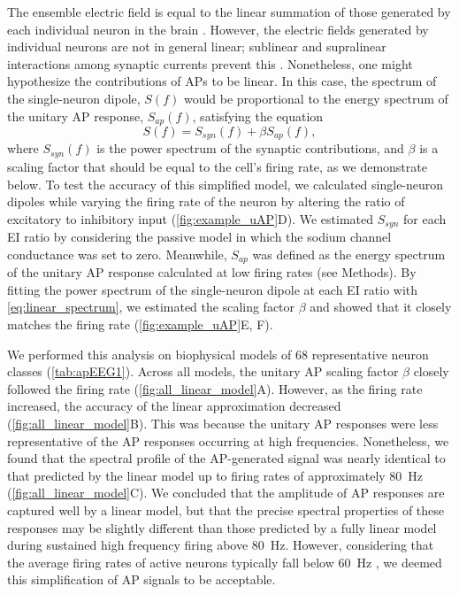 The ensemble electric field is equal to the linear summation of those generated by each individual neuron in the brain \cite{Nunez2006, Malmivuo1995}. However, the electric fields generated by individual neurons are not in general linear; sublinear and supralinear interactions among synaptic currents prevent this \cite{Tran-Van-Minh2015}. Nonetheless, one might hypothesize the contributions of APs to be linear. In this case, the spectrum of the single-neuron dipole, $S(f)$ would be proportional to the energy spectrum of the unitary AP response, $S_{ap}(f)$, satisfying the equation
\begin{equation} \label{eq:linear_spectrum}
S(f) = S_{syn}(f) + \beta S_{ap}(f)\mathrm{,}
\end{equation}
where $S_{syn}(f)$ is the power spectrum of the synaptic contributions, and $\beta$ is a scaling factor that should be equal to the cell's firing rate, as we demonstrate below. To test the accuracy of this simplified model, we calculated single-neuron dipoles while varying the firing rate of the neuron by altering the ratio of excitatory to inhibitory input ({\autoref{fig:example_uAP}D}). We estimated $S_{syn}$ for each EI ratio by considering the passive model in which the sodium channel conductance was set to zero. Meanwhile, $S_{ap}$ was defined as the energy spectrum of the unitary AP response calculated at low firing rates (see Methods). By fitting the power spectrum of the single-neuron dipole at each EI ratio with {\ref{eq:linear_spectrum}}, we estimated the scaling factor $\beta$ and showed that it closely matches the firing rate ({\autoref{fig:example_uAP}E, F}). 

We performed this analysis on biophysical models of 68 representative neuron classes \cite{Markram2015} (\autoref{tab:apEEG1}). Across all models, the unitary AP scaling factor $\beta$ closely followed the firing rate ({\autoref{fig:all_linear_model}A}). However, as the firing rate increased, the accuracy of the linear approximation decreased ({\autoref{fig:all_linear_model}B}). This was because the unitary AP responses were less representative of the AP responses occurring at high frequencies. Nonetheless, we found that the spectral profile of the AP-generated signal was nearly identical to that predicted by the linear model up to firing rates of approximately 80~\unit{\hertz} ({\autoref{fig:all_linear_model}C}). We concluded that the amplitude of AP responses are captured well by a linear model, but that the precise spectral properties of these responses may be slightly different than those predicted by a fully linear model during sustained high frequency firing above 80~\unit{\hertz}. However, considering that the average firing rates of active neurons typically fall below \qty{60}{\hertz} \cite{Baddeley1997, Griffith1966, Shafi2007, OConnor2010}, we deemed this simplification of AP signals to be acceptable.

